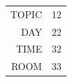 \documentclass[12pt]{article}
\title{\Huge\scshape\textrmlf{Moderator schedule}}
\author{}
\date{}
\begin{document}
\maketitle
\vspace{-5pc}
\raggedright
\thispagestyle{fancy}



\begin{tabular}{r l}
	\cellcolor{primary} TOPIC & 12 \\
	\cellcolor{primary} DAY & 22 \\
	\cellcolor{primary} TIME & 32 \\
	\cellcolor{primary} ROOM & 33 \\
\end{tabular}
\end{document}
